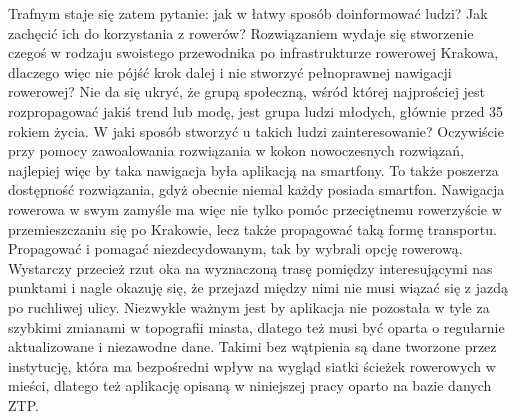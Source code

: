 Trafnym staje się zatem pytanie: jak w łatwy sposób doinformować ludzi? Jak zachęcić ich do korzystania z rowerów? Rozwiązaniem wydaje się stworzenie czegoś w rodzaju swoistego przewodnika po infrastrukturze rowerowej Krakowa, dlaczego więc nie pójść krok dalej i nie stworzyć pełnoprawnej nawigacji rowerowej? Nie da się ukryć, że grupą społeczną, wśród której najprościej jest rozpropagować jakiś trend lub modę, jest grupa ludzi młodych, głównie przed 35 rokiem życia. W jaki sposób stworzyć u takich ludzi zainteresowanie? Oczywiście przy pomocy zawoalowania rozwiązania w kokon nowoczesnych rozwiązań, najlepiej więc by taka nawigacja była aplikacją na smartfony. To także poszerza dostępność rozwiązania, gdyż obecnie niemal każdy posiada smartfon. \newline
Nawigacja rowerowa w swym zamyśle ma więc nie tylko pomóc przeciętnemu rowerzyście w przemieszczaniu się po Krakowie, lecz także propagować taką formę transportu. Propagować i pomagać niezdecydowanym, tak by wybrali opcję rowerową. Wystarczy przecież rzut oka na wyznaczoną trasę pomiędzy interesującymi nas punktami i nagle okazuję się, że przejazd między nimi nie musi wiązać się z jazdą po ruchliwej ulicy. Niezwykle ważnym jest by aplikacja nie pozostała w tyle za szybkimi zmianami w topografii miasta, dlatego też musi być oparta o regularnie aktualizowane i niezawodne dane. Takimi bez wątpienia są dane tworzone przez instytucję, która ma bezpośredni wpływ na wygląd siatki ścieżek rowerowych w mieści, dlatego też aplikację opisaną w niniejszej pracy oparto na bazie danych ZTP.
